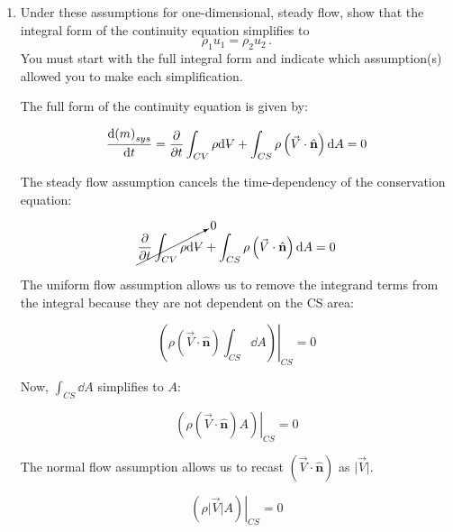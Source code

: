\documentclass[../main.tex]{subfiles}
\begin{document}
\begin{enumerate}[label = (\alph*)]

    \item 
        Under these assumptions for one-dimensional, steady flow, show that the integral form of the continuity equation simplifies to
        \[
            \rho_1 u_1 = \rho_2 u_2 \, .  
        \]
        You must start with the full integral form and indicate which assumption(s) allowed you to make each simplification.
   
        The full form of the continuity equation is given by:

        \begin{equation*}
            \frac{\dd (m)_{sys}}{\dd t} = %
            \pdv{t} \int_{CV} \rho \dd \volume +%
            \int_{CS} \rho \left({\vec{V} \cdot \hat{\mathbf{n}}}\right) \dd A
            = 0
        \end{equation*}

        The steady flow assumption cancels the time-dependency of the conservation equation:

        \begin{equation*}
            \cancelto{0}{\pdv{t} \int_{CV} \rho \dd \volume} +%
            \int_{CS} \rho \left({\vec{V} \cdot \hat{\mathbf{n}}}\right) \dd A
            = 0
        \end{equation*}

        The uniform flow assumption allows us to remove the integrand terms from the integral because they are not dependent on the CS area:

        \begin{equation*}
           \left. \left(\rho \left({\vec{V} \cdot \hat{\mathbf{n}}}\right) \int_{CS} \dd A\right) \right|_{CS}
            = 0
        \end{equation*}

        Now, \(\int_{CS} \dd A\) simplifies to \(A\):

        \begin{equation*}
            \left. \left(\rho \left({\vec{V} \cdot \hat{\mathbf{n}}}\right) A\right) \right|_{CS}
             = 0
        \end{equation*}

        The normal flow assumption allows us to recast \(\left({\vec{V} \cdot \hat{\mathbf{n}}}\right)\) as \(\lvert\vec{V}\rvert\).

        \begin{equation*}
            \left. \left(\rho \lvert\vec{V}\rvert A\right) \right|_{CS}
             = 0
        \end{equation*}


\end{enumerate}
\end{document}
